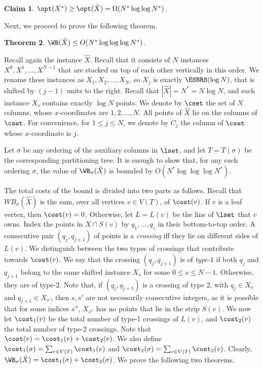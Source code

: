 \documentclass[11pt]{article}
\numberwithin{equation}{section}
\newtheorem{theorem}{Theorem}[section]
\newtheorem{claim}[theorem]{Claim}
\theoremstyle{definition}
\theoremstyle{plain}
\begin{document}
\begin{claim}
	$\opt(X^*)\geq \opt(\hat{X})=\Omega(N^*\log\log N^*)$.
\end{claim}
%
%
%
%
%
%
%
%
%
%
%
%



%

%

Next, we proceed to prove the following theorem. 

\begin{theorem}\label{thm: bound for first final instance}
$\WB(\hat X)\leq O(N^*\log\log\log N^*)$.
\end{theorem}
 
Recall again the instance $\hat X$. Recall that it consists of $N$ instances $X^0,X^1,\ldots,X^{N-1}$ that are stacked on top of each other vertically in this order. 
We rename these instances as $X_1,X_2,\ldots,X_{N}$, so $X_j$ is exactly $\ESBRS(\log N)$, that is shifted by $(j-1)$ units to the right. 
Recall that $|\hat X|=N^*=N\log N$, and each instance $X_s$ contains exactly $\log N$ points.
We denote by $\cset$ the set of $N$ columns, whose $x$-coordinates are $1,2,\ldots,N$. 
All points of $\hat X$ lie on the columns of $\cset$. For convenience, for $1\leq j\leq N$, we denote by $C_j$ the column of $\cset$ whose $x$-coordinate is $j$.



Let $\sigma$ be any ordering of the auxiliary columns in $\lset$, and let $T=T({\sigma})$ be the corresponding partitioning tree.
It is enough to show that, for any such ordering $\sigma$, the value of $\WB_{\sigma}(\hat{X})$ is bounded by $O(N^*\log\log\log N^*)$. %

The total costs of the bound is divided into two parts as follows. 
Recall that $WB_{\sigma}(\hat{X})$ is the sum, over all vertices $v\in V(T)$, of $\cost(v)$. 
If $v$ is a leaf vertex, then $\cost(v)=0$. Otherwise, let $L=L(v)$ be the line of $\lset$ that $v$ owns.
Index the points in $X \cap S(v)$ by $q_1,\ldots, q_z$ in their bottom-to-top order.
A consecutive pair $(q_j, q_{j+1})$ of points is a \emph{crossing} iff they lie on different sides of $L(v)$.  
We distinguish between the two types of crossings that contribute towards $\cost(v)$. 
We say that the crossing $(q_j, q_{j+1})$ is of \emph{type-$1$} if both $q_j$ and $q_{j+1}$ belong to the same shifted instance $X_s$ for some $0\leq s\leq N-1$.
Otherwise, they are of type-$2$. 
Note that, if $(q_j,q_{j+1})$ is a crossing of type $2$, with $q_j\in X_s$ and $q_{j+1}\in X_{s'}$, then $s,s'$ are not necessarily consecutive integers, as it is possible that for some indices $s''$, $X_{s''}$ has no points that lie in the strip $S(v)$.
We now let $\cost_1(v)$ be the total number of type-1 crossings of $L(v)$, and $\cost_2(v)$ the total number of type-2 crossings. Note that $\cost(v)=\cost_1(v)+\cost_2(v)$. 
We also define $\cost_1(\sigma) = \sum_{v \in V(T)} \cost_1(v)$ and $\cost_2(\sigma) = \sum_{v \in V(T)} \cost_2(v)$. 
Clearly, $\WB_{\sigma}(\hat X)=\cost_1(\sigma)+\cost_2(\sigma)$. 
%
We  prove the following two theorems. %
\end{document}

